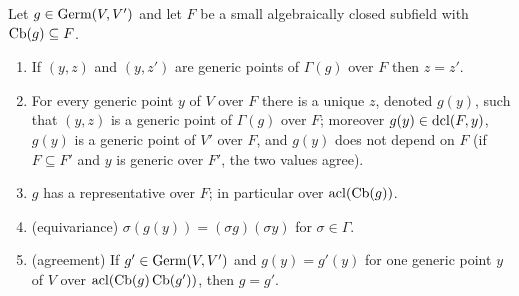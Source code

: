 \begin{lemma}\label{lem:eval}
Let $g\in\operatorname{Germ}(V,V')$ and let $F$ be a small algebraically closed subfield with
$\operatorname{Cb}(g)\subseteq F$.
\begin{enumerate}[nosep]
\item If $(y,z)$ and $(y,z')$ are generic points of $\Gamma(g)$ over $F$ then $z=z'$.
\item For every generic point $y$ of $V$ over $F$ there is a unique $z$, denoted
  $g(y)$, such that $(y,z)$ is a generic point of $\Gamma(g)$ over $F$; moreover
  $g(y)\in\operatorname{dcl}(F,y)$, $g(y)$ is a generic point of $V'$ over $F$, and $g(y)$ does not
  depend on $F$ (if $F\subseteq F'$ and $y$ is generic over $F'$, the two values agree).
\item $g$ has a representative over $F$; in particular over $\operatorname{acl}(\operatorname{Cb}(g))$.
\item (equivariance) $\sigma(g(y))=(\sigma g)(\sigma y)$ for $\sigma\in\Gamma$.
\item (agreement) If $g'\in\operatorname{Germ}(V,V')$ and $g(y)=g'(y)$ for one generic point $y$ of
  $V$ over $\operatorname{acl}(\operatorname{Cb}(g)\operatorname{Cb}(g'))$, then $g=g'$.
\end{enumerate}
\end{lemma}
